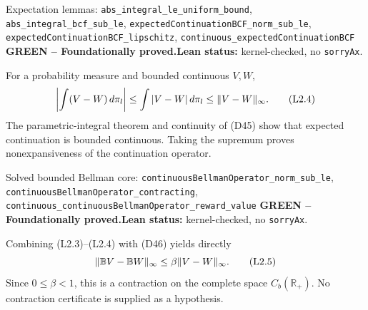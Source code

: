\documentclass[11pt]{article}
\newcommand{\R}{\mathbb R}
\newcommand{\leanname}[1]{\nolinkurl{#1}}
\newcommand{\eqL}[1]{\refstepcounter{equation}\tag{L#1}}
\newcommand{\formalcheck}{\textbf{Lean status:} kernel-checked, no \texttt{sorryAx}.}
\newcommand{\greenstatus}{\textcolor{proved}{\textbf{GREEN -- Foundationally proved.}}}
\begin{document}
\begin{greenbox}{Expectation lemmas: \leanname{abs_integral_le_uniform_bound},
\leanname{abs_integral_bcf_sub_le},
\leanname{expectedContinuationBCF_norm_sub_le},
\leanname{expectedContinuationBCF_lipschitz},
\leanname{continuous_expectedContinuationBCF}}
\greenstatus\quad\formalcheck

For a probability measure and bounded continuous \(V,W\),
\begin{equation}
 \left|\int(V-W)\,d\pi_l\right|
 \le\int|V-W|\,d\pi_l\le\|V-W\|_\infty. \eqL{2.4}\label{L2.4}
\end{equation}
The parametric-integral theorem and continuity of (D45) show that expected
continuation is bounded continuous.  Taking the supremum proves
nonexpansiveness of the continuation operator.
\end{greenbox}

\begin{greenbox}{Solved bounded Bellman core:
\leanname{continuousBellmanOperator_norm_sub_le},
\leanname{continuousBellmanOperator_contracting},
\leanname{continuous_continuousBellmanOperator_reward_value}}
\greenstatus\quad\formalcheck

Combining (L2.3)--(L2.4) with (D46) yields directly
\begin{equation}
 \|\mathbb BV-\mathbb BW\|_\infty
 \le\beta\|V-W\|_\infty. \eqL{2.5}\label{L2.5}
\end{equation}
Since \(0\le\beta<1\), this is a contraction on the complete space
\(C_b(\R_+)\).  No contraction certificate is supplied as a hypothesis.
\end{greenbox}
\end{document}
